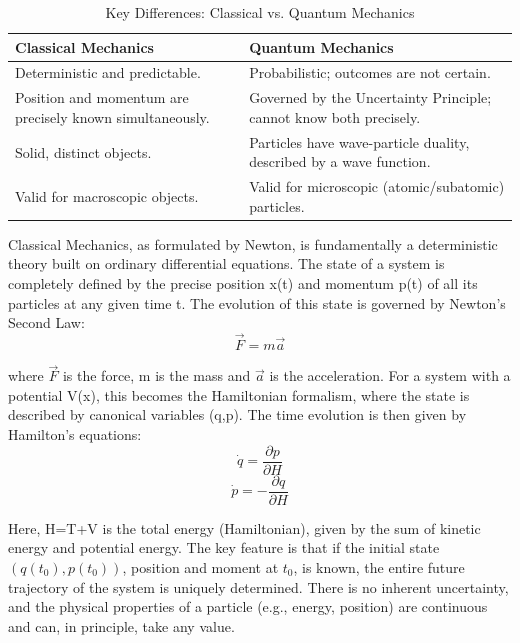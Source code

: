 \documentclass{article}
\begin{document}
\begin{table}[h]
\centering
\caption{Key Differences: Classical vs. Quantum Mechanics}
\label{tab:differences}
\begin{tabular}{p{} p{}}
\toprule
\textbf{Classical Mechanics} & \textbf{Quantum Mechanics} \\
\midrule
Deterministic and predictable. & Probabilistic; outcomes are not certain. \\
Position and momentum are precisely known simultaneously. & Governed by the Uncertainty Principle; cannot know both precisely. \\
Solid, distinct objects. & Particles have wave-particle duality, described by a wave function. \\
Valid for macroscopic objects. & Valid for microscopic (atomic/subatomic) particles. \\
\bottomrule
\end{tabular}
\end{table}
Classical Mechanics, as formulated by Newton, is fundamentally a deterministic theory built on ordinary differential equations. The state of a system is completely defined by the precise position x(t) and momentum p(t) of all its particles at any given time t. The evolution of this state is governed by Newton's Second Law:
\begin{equation}
    \vec{F} = m \vec{a} 
\end{equation}

where $\vec{F}$ is the force, m is the mass and $\vec{a}$ is the acceleration.
For a system with a potential V(x), this becomes the Hamiltonian formalism, where the state is described by canonical variables (q,p). The time evolution is then given by Hamilton's equations:
\begin{equation}
    \dot{q} = \frac{\partial p}{\partial H}
\end{equation}
\begin{equation}
    \dot{p} = - \frac{\partial q}{\partial H}
\end{equation}

Here, H=T+V is the total energy (Hamiltonian), given by the sum of kinetic energy and potential energy. The key feature is that if the initial state $(q(t_0),p(t_0))$, position and moment at $t_0$, is known, the entire future trajectory of the system is uniquely determined. There is no inherent uncertainty, and the physical properties of a particle (e.g., energy, position) are continuous and can, in principle, take any value.
\end{document}
